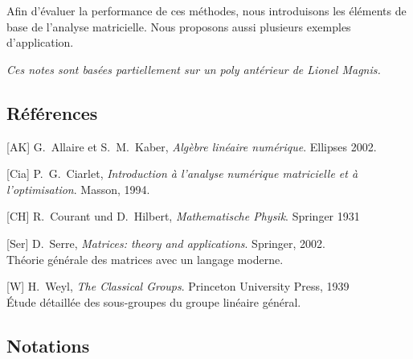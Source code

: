 Afin d'évaluer la performance de ces méthodes, nous introduisons les éléments
de base de l'analyse matricielle.
Nous proposons aussi plusieurs exemples d'application.

{\small\sl Ces notes sont basées partiellement sur un poly antérieur de Lionel
Magnis.}

\subsection{Références}

[AK]
G.~Allaire et S.~M.~Kaber,
\emph{Algèbre linéaire numérique}.
Ellipses 2002.


[Cia]
P.~G.~Ciarlet,
\emph{Introduction à l'analyse numérique matricielle et à
l'optimisation}.
Masson, 1994.

[CH]
R.~Courant und D.~Hilbert,
\emph{Mathematische Physik}.
Springer 1931

[Ser]
D.~Serre,
\emph{Matrices: theory and applications}.
Springer, 2002.\\
Théorie générale des matrices avec un langage moderne.


[W]
H.~Weyl,
\emph{The Classical Groups}.
Princeton University Press, 1939\\
Étude détaillée des sous-groupes du groupe linéaire général.

\clearpage
\subsection{Notations}

